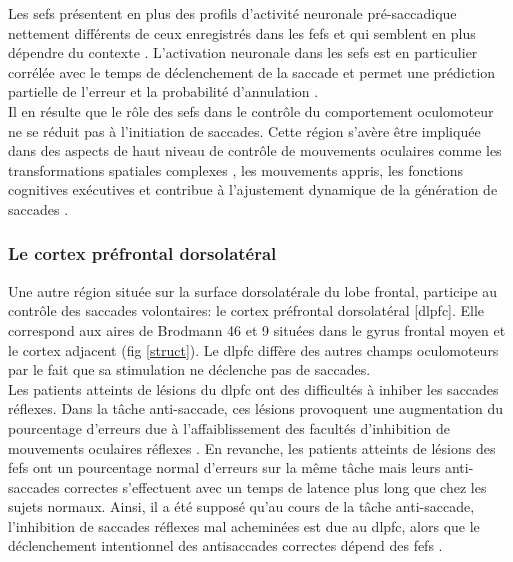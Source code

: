 Les \glspl{sef} présentent en plus des profils d'activité neuronale pré-saccadique nettement différents de ceux enregistrés dans les \glspl{fef} et qui semblent en plus dépendre du contexte \cite{Amador:2004, Chen:1995, Isoda:2002,  Ohmae:2008, Uchida:2007}.
L'activation neuronale dans les \glspl{sef} est en particulier corrélée avec le temps de déclenchement de la saccade et permet une prédiction partielle de l'erreur et la probabilité d'annulation \cite{Nakamura:2005, Amador:2000, Roesch:2003, Stuphorn:2000}.\\

Il en résulte que le rôle des \glspl{sef} dans le contrôle du comportement oculomoteur ne se réduit pas à l'initiation de saccades. Cette région s'avère être impliquée dans des aspects de haut niveau de contrôle de mouvements oculaires comme les transformations spatiales complexes \cite{Olson:1995}, les mouvements appris\cite{Chen:1995}, les fonctions cognitives exécutives \cite{Stuphorn:2006} et contribue à l'ajustement dynamique de la génération de saccades \cite{Stuphorn:2010}.\\

\subsubsection{Le cortex pr\'efrontal dorsolat\'eral}
Une autre région située sur la surface dorsolatérale du lobe frontal, participe au contrôle des saccades volontaires: le cortex préfrontal dorsolatéral [\gls{dlpfc}]. Elle correspond aux aires de Brodmann 46 et 9 situées dans le gyrus frontal moyen et le cortex adjacent (fig \ref{struct}). Le \gls{dlpfc} diffère des autres champs oculomoteurs par le fait que sa stimulation ne déclenche pas de saccades.\\

Les patients atteints de lésions du \gls{dlpfc} ont des difficultés à inhiber les saccades réflexes. Dans la tâche anti-saccade, ces lésions provoquent une augmentation du pourcentage d'erreurs due à l'affaiblissement des facultés d'inhibition de mouvements oculaires réflexes \cite{Pierrot:2003}. En revanche, les patients atteints de lésions des \glspl{fef} ont un pourcentage normal d'erreurs sur la même tâche mais leurs anti-saccades correctes s'effectuent avec un temps de latence plus long que chez les sujets normaux. Ainsi, il a été supposé qu'au cours de la tâche anti-saccade, l'inhibition de saccades réflexes mal acheminées est due au \gls{dlpfc}, alors que le déclenchement intentionnel des antisaccades correctes dépend des \glspl{fef} \cite{Rivaud:1994, Pierrot:2003}.\\

